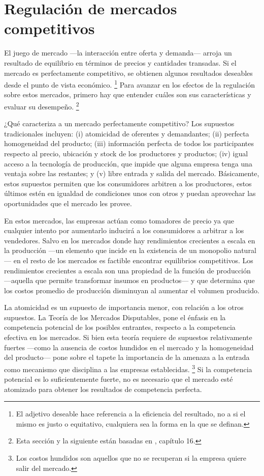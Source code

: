 \documentclass[
  12pt,
  spanish,
]{book}
\begin{document}
\hypertarget{regulaciuxf3n-de-mercados-competitivos}{%
\section{Regulación de mercados competitivos}\label{regulaciuxf3n-de-mercados-competitivos}}

El juego de mercado ---la interacción entre oferta y demanda--- arroja un resultado de equilibrio en términos de precios y cantidades transadas. Si el mercado es perfectamente competitivo, se obtienen algunos resultados deseables desde el punto de vista económico.
\footnote{El adjetivo deseable hace referencia a la eficiencia del resultado, no a si el mismo es justo o equitativo, cualquiera sea la forma en la que se definan.}
Para avanzar en los efectos de la regulación sobre estos mercados, primero hay que entender cuáles son sus características y evaluar su desempeño.
\footnote{Esta sección y la siguiente están basadas en \citet{Viscusi2005}, capítulo 16.}

¿Qué caracteriza a un mercado perfectamente competitivo? Los supuestos tradicionales incluyen: (i) atomicidad de oferentes y demandantes; (ii) perfecta homogeneidad del producto; (iii) información perfecta de todos los participantes respecto al precio, ubicación y stock de los productores y productos; (iv) igual acceso a la tecnología de producción, que impide que alguna empresa tenga una ventaja sobre las restantes; y (v) libre entrada y salida del mercado. Básicamente, estos supuestos permiten que los consumidores arbitren a los productores, estos últimos estén en igualdad de condiciones unos con otros y puedan aprovechar las oportunidades que el mercado les provee.

En estos mercados, las empresas actúan como tomadores de precio ya que cualquier intento por aumentarlo inducirá a los consumidores a arbitrar a los vendedores. Salvo en los mercados donde hay rendimientos crecientes a escala en la producción ---un elemento que incide en la existencia de un monopolio natural--- en el resto de los mercados es factible encontrar equilibrios competitivos. Los rendimientos crecientes a escala son una propiedad de la función de producción ---aquella que permite transformar insumos en productos--- y que determina que los costos promedio de producción disminuyan al aumentar el volumen producido.

La atomicidad es un supuesto de importancia menor, con relación a los otros supuestos. La Teoría de los Mercados Disputables, pone el énfasis en la competencia potencial de los posibles entrantes, respecto a la competencia efectiva en los mercados. Si bien esta teoría requiere de supuestos relativamente fuertes ---como la ausencia de costos hundidos en el mercado y la homogeneidad del producto--- pone sobre el tapete la importancia de la amenaza a la entrada como mecanismo que disciplina a las empresas establecidas.
\footnote{Los costos hundidos son aquellos que no se recuperan si la empresa quiere salir del mercado.}
Si la competencia potencial es lo suficientemente fuerte, no es necesario que el mercado esté atomizado para obtener los resultados de competencia perfecta.
\end{document}
